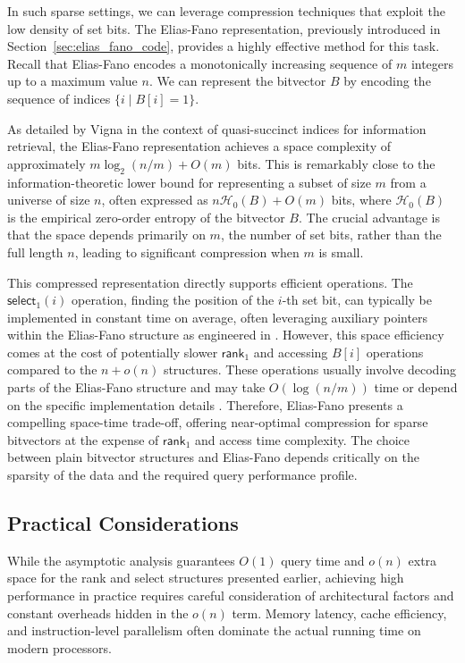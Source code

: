 In such sparse settings, we can leverage compression techniques that exploit the low density of set bits. The Elias-Fano representation, previously introduced in Section~\ref{sec:elias_fano_code}, provides a highly effective method for this task. Recall that Elias-Fano encodes a monotonically increasing sequence of $m$ integers up to a maximum value $n$. We can represent the bitvector $B$ by encoding the sequence of indices $\{ i \mid B[i]=1 \}$.

As detailed by Vigna \cite{vigna2013quasi} in the context of quasi-succinct indices for information retrieval, the Elias-Fano representation achieves a space complexity of approximately $m \log_2(n/m) + O(m)$ bits. This is remarkably close to the information-theoretic lower bound for representing a subset of size $m$ from a universe of size $n$, often expressed as $n\mathcal{H}_0(B) + O(m)$ bits, where $\mathcal{H}_0(B)$ is the empirical zero-order entropy of the bitvector $B$. The crucial advantage is that the space depends primarily on $m$, the number of set bits, rather than the full length $n$, leading to significant compression when $m$ is small.

This compressed representation directly supports efficient operations. The $\textsf{select}_1(i)$ operation, finding the position of the $i$-th set bit, can typically be implemented in constant time on average, often leveraging auxiliary pointers within the Elias-Fano structure as engineered in \cite{vigna2013quasi}. However, this space efficiency comes at the cost of potentially slower $\textsf{rank}_1$ and accessing $B[i]$ operations compared to the $n+o(n)$ structures. These operations usually involve decoding parts of the Elias-Fano structure and may take $O(\log(n/m))$ time or depend on the specific implementation details \cite{navarro2016compact}. Therefore, Elias-Fano presents a compelling space-time trade-off, offering near-optimal compression for sparse bitvectors at the expense of $\textsf{rank}_1$ and access time complexity. The choice between plain bitvector structures and Elias-Fano depends critically on the sparsity of the data and the required query performance profile.

\subsection{Practical Considerations} \label{subsec:practical_considerations}

While the asymptotic analysis guarantees $O(1)$ query time and $o(n)$ extra space for the \textsf{rank} and \textsf{select} structures presented earlier, achieving high performance in practice requires careful consideration of architectural factors and constant overheads hidden in the $o(n)$ term. Memory latency, cache efficiency, and instruction-level parallelism often dominate the actual running time on modern processors.

